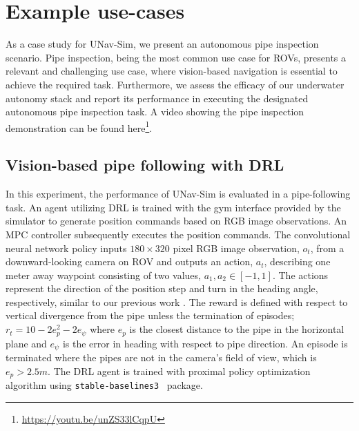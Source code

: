 \section{Example use-cases}\label{sec:tests}
As a case study for UNav-Sim, we present an autonomous pipe inspection scenario. 
Pipe inspection, being the most common use case for \ac{ROV}s, presents a relevant and challenging use case, where vision-based navigation is essential to achieve the required task. Furthermore, we assess the efficacy of our underwater autonomy stack and report its performance in executing the designated autonomous pipe inspection task. A video showing the pipe inspection demonstration can be found here\footnote{\url{https://youtu.be/unZS33lCqpU}}.



\subsection{Vision-based pipe following with DRL}\label{sec:example:planning}

In this experiment, the performance of UNav-Sim is evaluated in a pipe-following task. An agent utilizing \ac{DRL} is trained with the gym interface provided by the simulator to generate position commands based on RGB image observations. An \ac{MPC} controller subsequently executes the position commands. The convolutional neural network policy inputs $180\times320$ pixel RGB image observation, $o_t$, from a downward-looking camera on \ac{ROV} and outputs an action, $a_t$, describing one meter away waypoint consisting of two values, $a_1, a_2 \in [-1, 1]$. The actions represent the direction of the position step and turn in the heading angle, respectively, similar to our previous work \cite{halil}. The reward is defined with respect to vertical divergence from the pipe unless the termination of episodes; $r_t = 10 - 2e_p^2 - 2e_\psi$ where $e_p$ is the closest distance to the pipe in the horizontal plane and $e_\psi$ is the error in heading with respect to pipe direction. An episode is terminated where the pipes are not in the camera's field of view, which is $e_p > 2.5 m$. The \ac{DRL} agent is trained with proximal policy optimization~\cite{schulman2017proximal} algorithm using \texttt{stable-baselines3}~\cite{stable-baselines3} package.

